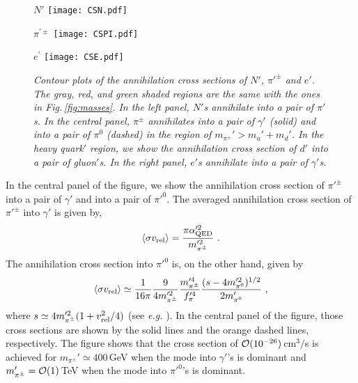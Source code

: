 \documentclass[aps,amsmath,preprint,epsf,superscriptaddress,nofootinbib,notitlepage]{revtex4-1}
\begin{document}
\begin{figure}[t]
\begin{center}
\begin{minipage}{.325\linewidth}
{\sl \small $N'$}  
\texttt{[image: CSN.pdf]}
 \end{minipage}
 \begin{minipage}{.325\linewidth}
 {\sl \small $\pi^{\prime\pm}$}  
  \texttt{[image: CSPI.pdf]}
 \end{minipage}
  \begin{minipage}{.325\linewidth}
    {\sl \small $e^{\prime}$}  
  \texttt{[image: CSE.pdf]}
 \end{minipage}
 \end{center}
\caption{\sl \small
Contour plots of the annihilation cross sections of $N'$, $\pi'^\pm$ and $e'$.
The gray, red, and green  shaded regions are the same with the ones in Fig.\,\ref{fig:masses}.
In the left panel, $N'$s annihilate into a pair of $\pi'$s.
In the central panel, $\pi^\pm$ annihilates into a pair of $\gamma'$ (solid) and 
into a pair of $\pi^0$ (dashed) in the region of $m_{\pi^\pm}' > m_u' + m_d'$.
In the heavy quark$'$ region, we show the annihilation cross section of $d'$ into 
a pair of gluon$'$s.
In the right panel, $e'$s annihilate into a pair of $\gamma'$s.
}
\label{fig:CS}
\end{figure}

In the central panel of the figure, we show the annihilation cross section
of $\pi'^\pm$ into a pair of $\gamma'$ and into a pair of $\pi'^0$.
The averaged annihilation cross section of $\pi'^\pm$ into $\gamma'$ is given by,
\begin{eqnarray}
\left\langle {\sigma v_{\rm rel}} \right\rangle = \frac{\pi \alpha_{\rm QED}'^2}{m_{\pi^\pm}'^2}\ .
\end{eqnarray}
The annihilation cross section into $\pi'^0$ is, on the other hand, given by 
\begin{eqnarray}
\label{eq:CSpion}
\left\langle {\sigma v_{\rm rel}} \right\rangle \simeq 
\frac{1}{16\pi} \frac{9}{4m_{\pi^\pm}'^2}
\frac{m_{\pi^\pm}'^4}{f_\pi'^4}
\frac{(s - 4 m_{\pi^0}'^2)^{1/2}}{2 m_{\pi^0}'}\ ,
\end{eqnarray}
where $s \simeq 4 m_{\pi^\pm}'^2 (1 + v_{\rm rel}^2/4)$ (see {\it e.g.}  \cite{Weinberg:1966kf}).
In the central panel of the figure, those cross sections are shown by the solid lines and the orange dashed lines, respectively.
The figure shows that the cross section of ${\cal O}(10^{-26})$\,cm$^3/$s is achieved for $m_{\pi^\pm}' \simeq 400$\,GeV 
when the mode into $\gamma'$'s is dominant  and $m_{\pi^\pm}' = {\cal O}(1)$\,TeV
when the mode into $\pi'^0$'s is dominant.
\end{document}
